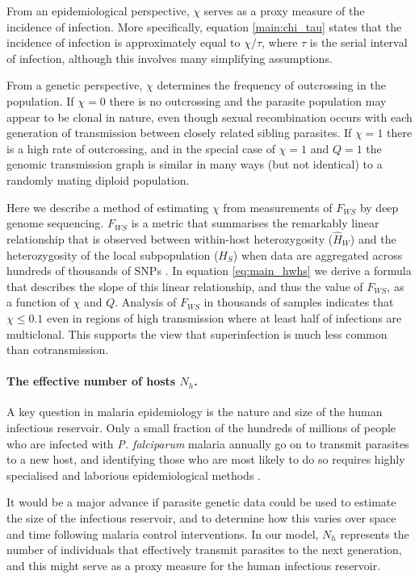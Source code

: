 \documentclass[_main.tex]{subfiles}
\begin{document}
From an epidemiological perspective, $\chi$ serves as a proxy measure of the incidence of infection.  More specifically, equation \ref{main:chi_tau} states that the incidence of infection is approximately equal to $\chi/ \tau$, where $\tau$ is the serial interval of infection, although this involves many simplifying assumptions.  

From a genetic perspective, $\chi$ determines the frequency of outcrossing in the population.  If $\chi = 0$ there is no outcrossing and the parasite population may appear to be clonal in nature, even though sexual recombination occurs with each generation of transmission between closely related sibling parasites.  If $\chi = 1$ there is a high rate of outcrossing, and in the special case of $\chi = 1$ and $Q = 1$ the genomic transmission graph is similar in many ways (but not identical) to a randomly mating diploid population. 

Here we describe a method of estimating $\chi$ from measurements of $F_{WS}$ by deep genome sequencing.  $F_{WS}$ is a metric that summarises the remarkably linear relationship that is observed between within-host heterozygosity ($\widehat{H}_W$) and the heterozygosity of the local subpopulation ($H_S$) when data are aggregated across hundreds of thousands of SNPs \cite{Manske2012}.  In equation \ref{eq:main_hwhs} we derive a formula that describes the slope of this linear relationship, and thus the value of $F_{WS}$, as a function of  $\chi$ and $Q$.  Analysis of $F_{WS}$ in thousands of samples indicates that $\chi \leq 0.1$ even in regions of high transmission where at least half of infections are multiclonal.  This supports the view that superinfection is much less common than cotransmission.

\paragraph{The effective number of hosts $N_h$.}  A key question in malaria epidemiology is the nature and size of the human infectious reservoir.  Only a small fraction of the hundreds of millions of people who are infected with \textit{P. falciparum} malaria annually \cite{WHO2022} go on to transmit parasites to a new host, and identifying those who are most likely to do so requires highly specialised and laborious epidemiological methods \cite{Goncalves2017}.  

It would be a major advance if parasite genetic data could be used to estimate the size of the infectious reservoir, and to determine how this varies over space and time following malaria control interventions.  In our model, $N_h$ represents the number of individuals that effectively transmit parasites to the next generation, and this might serve as a proxy measure for the human infectious reservoir.  
\end{document}
